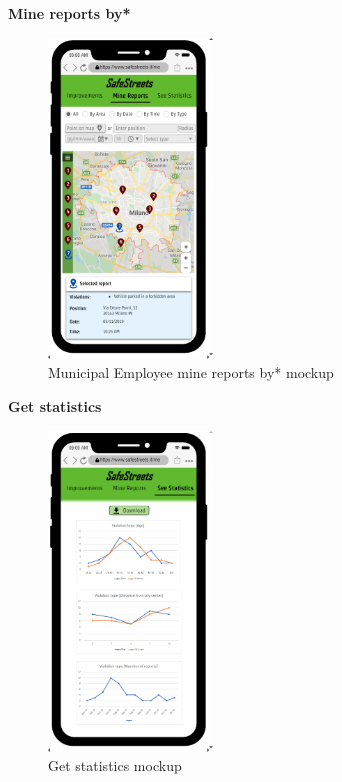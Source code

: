 					\begin{center}
						{\small \textbf{Mine reports by*}}
					\end{center}
					\vspace{-5mm}
					\begin{figure}[!h]
						\centering
						\includegraphics[height=8.5cm]{images/MockUp/Authority/MunicipalEmployee/MineReports.png}
						\caption{Municipal Employee mine reports by* mockup}
					\end{figure}
					\vspace{-1mm}
					\begin{center}
						{\small \textbf{Get statistics}}
					\end{center}
					\vspace{-5mm}
					\begin{figure}[!h]
						\centering
						\includegraphics[height=8.5cm]{images/MockUp/Authority/MunicipalEmployee/SeeStatistics.png}
						\caption{Get statistics mockup}
					\end{figure}
				\clearpage
